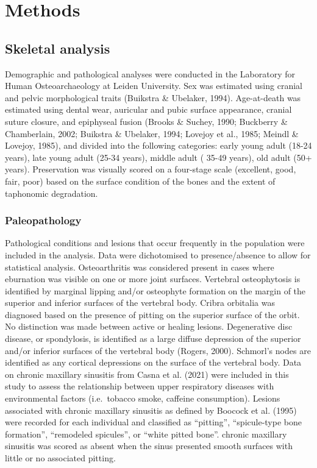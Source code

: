 \documentclass[
]{article}
\begin{document}
\hypertarget{methods}{%
\section{Methods}\label{methods}}

\hypertarget{skeletal-analysis}{%
\subsection{Skeletal analysis}\label{skeletal-analysis}}

Demographic and pathological analyses were conducted in the Laboratory
for Human Osteoarchaeology at Leiden University. Sex was estimated using
cranial and pelvic morphological traits (Buikstra \& Ubelaker, 1994).
Age-at-death was estimated using dental wear, auricular and pubic
surface appearance, cranial suture closure, and epiphyseal fusion
(Brooks \& Suchey, 1990; Buckberry \& Chamberlain, 2002; Buikstra \&
Ubelaker, 1994; Lovejoy et al., 1985; Meindl \& Lovejoy, 1985), and
divided into the following categories: early young adult (18-24 years),
late young adult (25-34 years), middle adult ( 35-49 years), old adult
(50+ years). Preservation was visually scored on a four-stage scale
(excellent, good, fair, poor) based on the surface condition of the
bones and the extent of taphonomic degradation.

\hypertarget{paleopathology}{%
\subsubsection{Paleopathology}\label{paleopathology}}

Pathological conditions and lesions that occur frequently in the
population were included in the analysis. Data were dichotomised to
presence/absence to allow for statistical analysis. Osteoarthritis was
considered present in cases where eburnation was visible on one or more
joint surfaces. Vertebral osteophytosis is identified by marginal
lipping and/or osteophyte formation on the margin of the superior and
inferior surfaces of the vertebral body. Cribra orbitalia was diagnosed
based on the presence of pitting on the superior surface of the orbit.
No distinction was made between active or healing lesions. Degenerative
disc disease, or spondylosis, is identified as a large diffuse
depression of the superior and/or inferior surfaces of the vertebral
body (Rogers, 2000). Schmorl's nodes are identified as any cortical
depressions on the surface of the vertebral body. Data on chronic
maxillary sinusitis from Casna et al. (2021) were included in this study
to assess the relationship between upper respiratory diseases with
environmental factors (i.e.~tobacco smoke, caffeine consumption).
Lesions associated with chronic maxillary sinusitis as defined by
Boocock et al. (1995) were recorded for each individual and classified
as ``pitting'', ``spicule-type bone formation'', ``remodeled spicules'',
or ``white pitted bone''. chronic maxillary sinusitis was scored as
absent when the sinus presented smooth surfaces with little or no
associated pitting.
\end{document}
